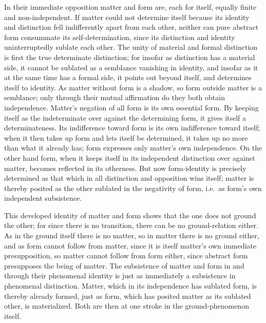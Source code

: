 \documentclass[12pt,a4paper,openany]{book}
\newcommand{\opage}[1]{\marginnote{\footnotesize\textit{[#1]}}}
\begin{document}
In their immediate opposition matter and
form are, each for itself, equally finite and non-independent.
If matter could not determine itself because its
identity and distinction fell indifferently apart from each other,
neither can pure abstract form consummate
its self-determination, since its distinction and identity
\setcounter{footnote}{0}%
\opage{146}uninterruptedly sublate each other. The unity of material
and formal distinction is first the true determinate
distinction; for insofar as distinction has a material side,
it cannot be sublated as a semblance vanishing in identity,
and insofar as it at the same time
has a formal side, it points out beyond itself, and determines
itself to identity. As matter without form
is a shadow, so form outside matter is a
semblance; only through their mutual affirmation do they
both obtain independence. Matter's negation of all form
is its own essential form. By keeping itself as
the indeterminate over against the determining form, it gives
itself a determinateness. Its indifference toward form
is its own indifference toward itself; when
it then takes up form and lets itself be determined, it takes up
no more than what it already has; form expresses
only matter's own independence. On the
other hand form, when it keeps itself in its
independent distinction over against matter, becomes reflected in
its otherness. But now form-identity is precisely determined
as that which in all distinction and opposition wins
itself; matter is thereby posited as the other sublated
in the negativity of form, i.e.\ as form's own independent
subsistence.

This developed identity of matter and form shows
that the one does not ground the other; for since there
is no transition, there can be no ground-relation
either. As in the ground itself there is no matter,
so in matter there is no ground either, and
as form cannot follow from matter, since it
is itself matter's own immediate presupposition, so
matter cannot follow from form either, since abstract
form presupposes the being of matter. The subsistence of matter
and form in and through their phenomenal
\setcounter{footnote}{0}%
\opage{147}identity is just as immediately a subsistence in phenomenal distinction. Matter, which in its independence has sublated
form, is thereby already formed, just as form,
which has posited matter as its sublated other, is
materialized. Both are then at one stroke in the ground-phenomenon
itself.
\end{document}
